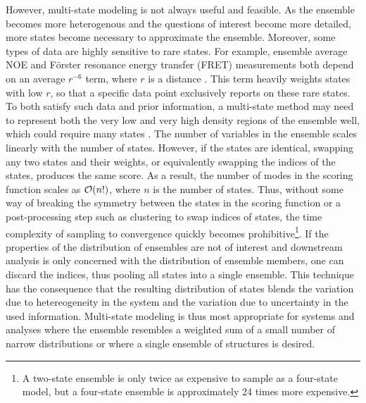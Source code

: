 \documentclass[../../main.tex]{subfiles}
\begin{document}
\begin{refsection}
	However, multi-state modeling is not always useful and feasible.
	As the ensemble becomes more heterogenous and the questions of interest become more detailed, more states become necessary to approximate the ensemble.
	Moreover, some types of data are highly sensitive to rare states.
	For example, ensemble average NOE and F{\"o}rster resonance energy transfer (FRET) measurements both depend on an average $r^{-6}$ term, where $r$ is a distance \supercite{brungerThreedimensionalStructureProteins1986,cloreApplicationMolecularDynamics1986,fletcherTreatmentNOEConstraints1996,schulerSingleMoleculeFRETSpectroscopy2016}.
	This term heavily weights states with low $r$, so that a specific data point exclusively reports on these rare states.
	To both satisfy such data and prior information, a multi-state method may need to represent both the very low and very high density regions of the ensemble well, which could require many states \supercite{bonomiPrinciplesProteinStructural2017}.
	The number of variables in the ensemble scales linearly with the number of states.
	However, if the states are identical, swapping any two states and their weights, or equivalently swapping the indices of the states, produces the same score.
	As a result, the number of modes in the scoring function scales as $\order{n!}$, where $n$ is the number of states.
	Thus, without some way of breaking the symmetry between the states in the scoring function or a post-processing step such as clustering to swap indices of states, the time complexity of sampling to convergence quickly becomes prohibitive\footnote{
		A two-state ensemble is only twice as expensive to sample as a four-state model, but a four-state ensemble is approximately 24 times more expensive.}.
	If the properties of the distribution of ensembles are not of interest and downstream analysis is only concerned with the distribution of ensemble members, one can discard the indices, thus pooling all states into a single ensemble.
	This technique has the consequence that the resulting distribution of states blends the variation due to hetereogeneity in the system and the variation due to uncertainty in the used information.
	Multi-state modeling is thus most appropriate for systems and analyses where the ensemble resembles a weighted sum of a small number of narrow distributions or where a single ensemble of structures is desired.



\end{refsection}
\end{document}
